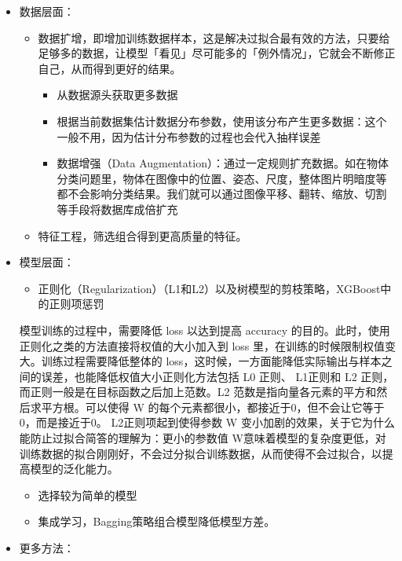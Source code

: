\documentclass[11pt]{article}
\providecommand{\tightlist}{%
      \setlength{\itemsep}{0pt}\setlength{\parskip}{0pt}}
\begin{document}
\begin{itemize}
\item
  数据层面：

  \begin{itemize}
  \tightlist
  \item
    数据扩增，即增加训练数据样本，这是解决过拟合最有效的方法，只要给足够多的数据，让模型「看见」尽可能多的「例外情况」，它就会不断修正自己，从而得到更好的结果。

    \begin{itemize}
    \tightlist
    \item
      从数据源头获取更多数据
    \item
      根据当前数据集估计数据分布参数，使用该分布产生更多数据：这个一般不用，因为估计分布参数的过程也会代入抽样误差
    \item
      数据增强（Data
      Augmentation）：通过一定规则扩充数据。如在物体分类问题里，物体在图像中的位置、姿态、尺度，整体图片明暗度等都不会影响分类结果。我们就可以通过图像平移、翻转、缩放、切割等手段将数据库成倍扩充
    \end{itemize}
  \item
    特征工程，筛选组合得到更高质量的特征。
  \end{itemize}
\item
  模型层面：

  \begin{itemize}
  \tightlist
  \item
    正则化（Regularization）（L1和L2）以及树模型的剪枝策略，XGBoost中的正则项惩罚
  \end{itemize}

  模型训练的过程中，需要降低 loss 以达到提高 accuracy
  的目的。此时，使用正则化之类的方法直接将权值的大小加入到 loss
  里，在训练的时候限制权值变大。训练过程需要降低整体的
  loss，这时候，一方面能降低实际输出与样本之间的误差，也能降低权值大小正则化方法包括
  L0 正则、 L1正则和 L2 正则，而正则一般是在目标函数之后加上范数。L2
  范数是指向量各元素的平方和然后求平方根。可以使得 W
  的每个元素都很小，都接近于0，但不会让它等于0，而是接近于0。
  L2正则项起到使得参数 W
  变小加剧的效果，关于它为什么能防止过拟合简答的理解为：更小的参数值
  W意味着模型的复杂度更低，对训练数据的拟合刚刚好，不会过分拟合训练数据，从而使得不会过拟合，以提高模型的泛化能力。

  \begin{itemize}
  \item
    选择较为简单的模型
  \item
    集成学习，Bagging策略组合模型降低模型方差。
  \end{itemize}
\item
  更多方法：


\end{itemize}
\end{document}
